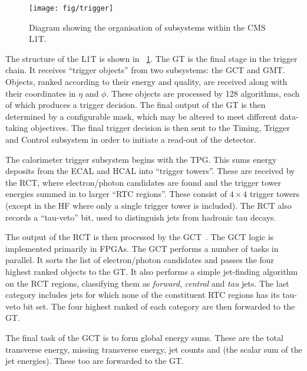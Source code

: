 \begin{figure}[h!]
\centering
\texttt{[image: fig/trigger]}
\caption[Diagram showing the organisation of subsystems within the \ac{CMS}
\ac{L1T}]{Diagram showing the organisation of subsystems within the \ac{CMS}
  \ac{L1T}.}
\label{fig:expt_cms_trigger}
\end{figure}

The structure of the \ac{L1T} is shown in \fig~\ref{fig:expt_cms_trigger}. The
\ac{GT} is the final stage in the trigger chain. It receives ``trigger objects''
from two subsystems: the \ac{GCT} and \ac{GMT}. Objects, ranked according to
their energy and quality, are received along with their coordinates in $\eta$
and $\phi$. These objects are processed by 128 algorithms, each of which
produces a trigger decision. The final output of the \ac{GT} is then determined
by a configurable mask, which may be altered to meet different data-taking
objectives. The final trigger decision is then sent to the Timing, Trigger and
Control subsystem in order to initiate a read-out of the detector.

The calorimeter trigger subsystem begins with the \ac{TPG}. This sums energy
deposits from the \ac{ECAL} and \ac{HCAL} into ``trigger towers''. These are
received by the \ac{RCT}, where electron/photon candidates are found and the
trigger tower energies summed in to larger ``\ac{RTC} regions''. These consist
of $4\times 4$ trigger towers (except in the \ac{HF} where only a single trigger
tower is included). The \ac{RCT} also records a ``tau-veto'' bit, used to
distinguish jets from hadronic tau decays.

The output of the \ac{RCT} is then processed by the
\ac{GCT}~\cite{jj_thesis}. The \ac{GCT} logic is implemented primarily in
\acp{FPGA}. The \ac{GCT} performs a number of tasks in parallel. It sorts the
list of electron/photon candidates and passes the four highest ranked objects to
the \ac{GT}. It also performs a simple jet-finding algorithm on the \ac{RCT}
regions, classifying them as \emph{forward}, \emph{central} and \emph{tau}
jets. The last category includes jets for which none of the constituent \ac{RTC}
regions has its tau-veto bit set. The four highest ranked of each category are
then forwarded to the \ac{GT}.

The final task of the \ac{GCT} is to form global energy sums. These are the
total transverse energy, missing transverse energy, jet counts and \HT (the
scalar sum of the jet energies). These too are forwarded to the \ac{GT}.


